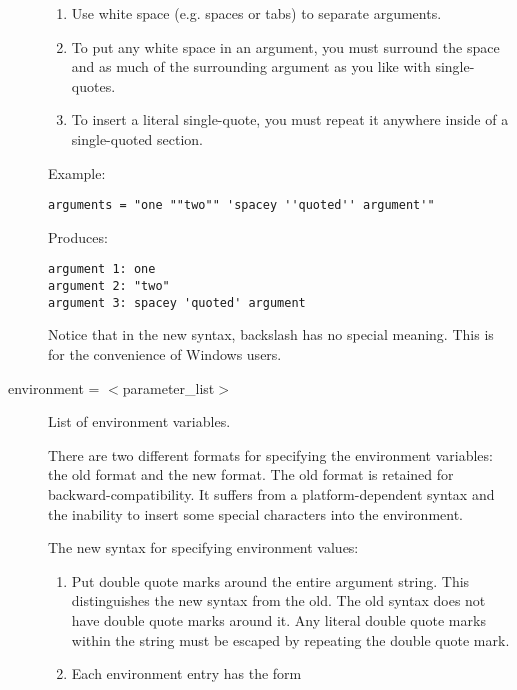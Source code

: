 \begin{description}
\begin{enumerate}
\item Use white space (e.g. spaces or tabs) to separate arguments.

\item To put any white space in an argument, you must surround the
space and as much of the surrounding argument as you like with
single-quotes.

\item To insert a literal single-quote, you must repeat it anywhere
inside of a single-quoted section.

\end{enumerate}

Example:

\begin{verbatim}
arguments = "one ""two"" 'spacey ''quoted'' argument'"
\end{verbatim}

Produces:

\begin{verbatim}
argument 1: one
argument 2: "two"
argument 3: spacey 'quoted' argument
\end{verbatim}

Notice that in the new syntax, backslash has no special meaning.  This
is for the convenience of Windows users.


\item[environment = $<$parameter\_list$>$] List of environment
\label{man-condor-submit-environment}
variables.

There are two different formats for specifying the environment
variables: the old format and the new format.  The old format is
retained for backward-compatibility.  It suffers from a
platform-dependent syntax and the inability to insert some special
characters into the environment.

The new syntax for specifying environment values:

\begin{enumerate}

\item Put double quote marks around the entire argument string.  This
distinguishes the new syntax from the old.
The old syntax does not have double quote marks around it.
Any literal double quote marks within the string
must be escaped by repeating the double quote mark.

\item Each environment entry has the form


\end{enumerate}
\end{description}
